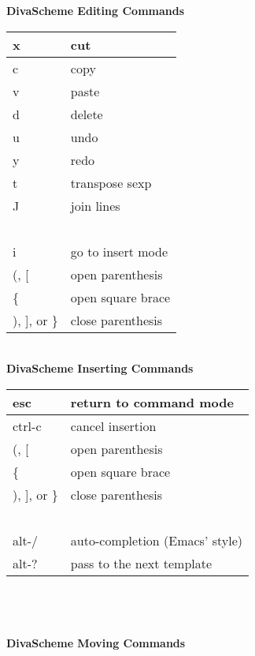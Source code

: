\documentclass[landscape,twocolumn,letterpaper]{article}
\begin{document}
{\bf DivaScheme Editing Commands}

\begin{tabular}{|l|l|} \hline
       x &           cut \\ \hline
       c    &        copy \\ \hline
       v       &     paste \\ \hline
       d         &   delete \\ \hline
       u           & undo \\ \hline
       y            &redo \\ \hline
       t            & transpose sexp \\ \hline
       J	    & join lines \\ \hline
	~ & ~ \\ \hline 
       i	    & go to insert mode \\ \hline
    (, [	    & open parenthesis \\ \hline
       \{   & open square brace \\ \hline
    ), ], or \} &	    close parenthesis \\ \hline
\end{tabular}    

~ \\
  
{\bf DivaScheme Inserting Commands}

\begin{tabular}{|l|l|} \hline
      esc	&    return to command mode \\ \hline
     ctrl-c	 &   cancel insertion \\ \hline
    (, [	   &  open parenthesis \\ \hline
       \{	   &  open square brace \\ \hline
    ), ], or \}	 &    close parenthesis \\ \hline
 	~ & ~ \\ \hline
     alt-/	&    auto-completion (Emacs' style) \\ \hline
     alt-?       &   pass to the next template \\ \hline
\end{tabular} 

~ \\

~ \\ 

~ \\

{\bf DivaScheme Moving Commands}
\end{document}
